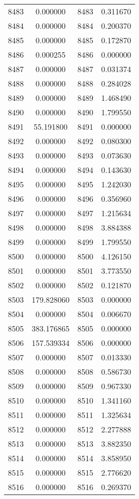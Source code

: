 \documentclass[12pt]{article}
\begin{document}
\begin{longtable}{@{}cccc@{}}
8483 & 0.000000 & 8483 & 0.311670 \\
8484 & 0.000000 & 8484 & 0.200370 \\
8485 & 0.000000 & 8485 & 0.172870 \\
8486 & 0.000255 & 8486 & 0.000000 \\
8487 & 0.000000 & 8487 & 0.031374 \\
8488 & 0.000000 & 8488 & 0.284028 \\
8489 & 0.000000 & 8489 & 1.468490 \\
8490 & 0.000000 & 8490 & 1.799550 \\
8491 & 55.191800 & 8491 & 0.000000 \\
8492 & 0.000000 & 8492 & 0.080300 \\
8493 & 0.000000 & 8493 & 0.073630 \\
8494 & 0.000000 & 8494 & 0.143630 \\
8495 & 0.000000 & 8495 & 1.242030 \\
8496 & 0.000000 & 8496 & 0.356960 \\
8497 & 0.000000 & 8497 & 1.215634 \\
8498 & 0.000000 & 8498 & 3.884388 \\
8499 & 0.000000 & 8499 & 1.799550 \\
8500 & 0.000000 & 8500 & 4.126150 \\
8501 & 0.000000 & 8501 & 3.773550 \\
8502 & 0.000000 & 8502 & 0.121870 \\
8503 & 179.828060 & 8503 & 0.000000 \\
8504 & 0.000000 & 8504 & 0.006670 \\
8505 & 383.176865 & 8505 & 0.000000 \\
8506 & 157.539334 & 8506 & 0.000000 \\
8507 & 0.000000 & 8507 & 0.013330 \\
8508 & 0.000000 & 8508 & 0.586730 \\
8509 & 0.000000 & 8509 & 0.967330 \\
8510 & 0.000000 & 8510 & 1.341160 \\
8511 & 0.000000 & 8511 & 1.325634 \\
8512 & 0.000000 & 8512 & 2.277888 \\
8513 & 0.000000 & 8513 & 3.882350 \\
8514 & 0.000000 & 8514 & 3.858950 \\
8515 & 0.000000 & 8515 & 2.776620 \\
8516 & 0.000000 & 8516 & 0.269370 \\

\end{longtable}
\end{document}
